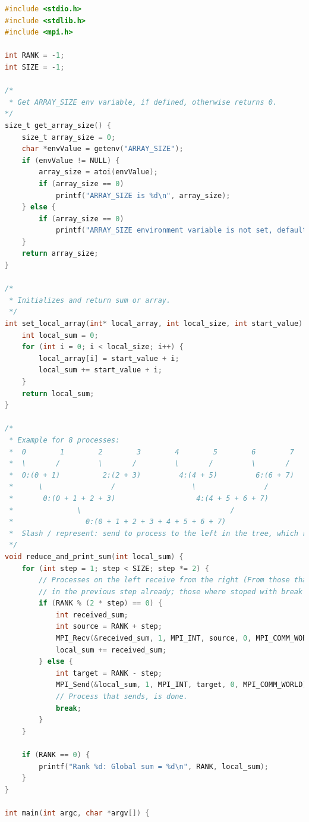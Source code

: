 \begin{lstlisting}[language=C]
#include <stdio.h>
#include <stdlib.h>
#include <mpi.h>

int RANK = -1;
int SIZE = -1;

/*
 * Get ARRAY_SIZE env variable, if defined, otherwise returns 0.
*/
size_t get_array_size() {
    size_t array_size = 0;
    char *envValue = getenv("ARRAY_SIZE");
    if (envValue != NULL) {
        array_size = atoi(envValue);
        if (array_size == 0)
            printf("ARRAY_SIZE is %d\n", array_size);
    } else {
        if (array_size == 0)
            printf("ARRAY_SIZE environment variable is not set, default is %d.\n", array_size);
	}
    return array_size;
}

/*
 * Initializes and return sum or array.
 */
int set_local_array(int* local_array, int local_size, int start_value) {
    int local_sum = 0; 
    for (int i = 0; i < local_size; i++) {
        local_array[i] = start_value + i;
        local_sum += start_value + i;
    }
    return local_sum;
}

/*
 * Example for 8 processes:
 *  0        1        2        3        4        5        6        7
 *  \       /         \       /         \       /         \       /
 *  0:(0 + 1)          2:(2 + 3)         4:(4 + 5)         6:(6 + 7)
 *      \                /                  \                /
 *       0:(0 + 1 + 2 + 3)                   4:(4 + 5 + 6 + 7)
 *               \                                   /
 *                 0:(0 + 1 + 2 + 3 + 4 + 5 + 6 + 7)
 *  Slash / represent: send to process to the left in the tree, which receives and sums up.
 */
void reduce_and_print_sum(int local_sum) {
    for (int step = 1; step < SIZE; step *= 2) {
        // Processes on the left receive from the right (From those that didn't send
        // in the previous step already; those where stoped with break after send.)
        if (RANK % (2 * step) == 0) {
            int received_sum;
            int source = RANK + step;
            MPI_Recv(&received_sum, 1, MPI_INT, source, 0, MPI_COMM_WORLD, MPI_STATUS_IGNORE);
            local_sum += received_sum;
        } else {
            int target = RANK - step;
            MPI_Send(&local_sum, 1, MPI_INT, target, 0, MPI_COMM_WORLD);
            // Process that sends, is done.
            break;
        }
    }

    if (RANK == 0) {
        printf("Rank %d: Global sum = %d\n", RANK, local_sum);
    }
}

int main(int argc, char *argv[]) {


\end{lstlisting}
